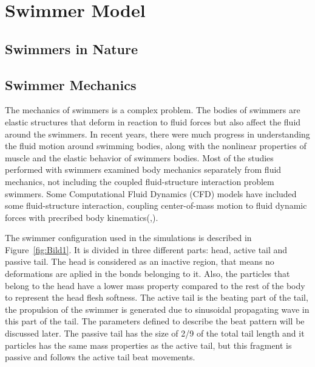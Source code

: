 

\chapter{Swimmer Model}
\label{chap:chapter_2}

\section{Swimmers in Nature}
\label{sec:section_1}







\section{Swimmer Mechanics}
\label{sec:section 2}
The mechanics of swimmers is a complex problem\cite{tytell_interactions_2010}. The bodies of swimmers are elastic structures that deform in reaction to fluid forces but also affect the fluid around the swimmers.
In recent years, there were much progress in understanding the fluid motion around swimming bodies\cite{shadwick_fish_2006}, along with the nonlinear properties of muscle\cite{williams_new_2010} and the elastic behavior of 
swimmers bodies\cite{williams_new_2010}. Most of the studies performed with swimmers examined body mechanics separately from fluid mechanics, not including the coupled
fluid-structure interaction problem swimmers. Some Computational Fluid Dynamics (CFD) models have included some fluid-structure interaction, coupling center-of-mass motion to 
fluid dynamic forces with precribed body kinematics(\cite{kern_simulations_2006},\cite{borazjani_role_2010}).

\par

The swimmer configuration used in the simulations is described in Figure~\ref{fig:Bild1}. It is divided in three different parts: head, active tail and passive tail. The head 
is considered as an inactive region, that means no deformations are aplied in the bonds belonging to it. Also, the particles that belong to the head have a lower mass property
compared to the rest of the body to represent the head flesh softness. The active tail is the beating part of the tail, the propulsion of the swimmer is generated due to sinusoidal 
propagating wave in this part of the tail. The parameters defined to describe the beat pattern will be discussed later. The passive tail has the size of 2/9 of the total tail length
and it particles has the same mass properties as the active tail, but this fragment is passive and follows the active tail beat movements. 


